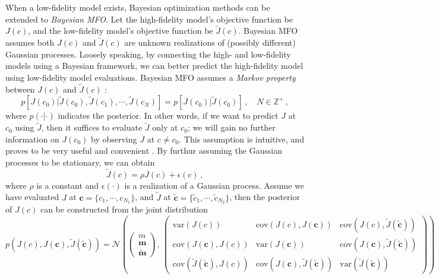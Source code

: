\documentclass[a4paper,onecolumn]{article}
\theoremstyle{remark}
\begin{document}
\noindent When a low-fidelity model exists, Bayesian optimization methods
can be extended to \emph{Bayesian MFO}.
Let the high-fidelity model's objective function
be $J(c)$, and the low-fidelity model's objective function be $\tilde{J}(c)$.
Bayesian MFO assumes both $J(c)$ and $\tilde{J}(c)$ are unknown realizations
of (possibly different) Gaussian processes.
Loosely speaking, by connecting the high- and low-fidelity models using 
a Bayesian framework, we can better predict the high-fidelity model using
low-fidelity model evaluations.
Bayesian MFO assumes a \emph{Markov property}
between $J(c)$ and $\tilde{J}(c)$ \cite{KennedyOhagan2}:
\begin{equation}
    p\left[ J(c_0)\Big| \tilde{J}(c_0), \tilde{J}(c_1),\cdots, \tilde{J}(c_N)\right]
    = p\left[ J(c_0)\Big| \tilde{J}(c_0)\right]
    \,,\quad
    N\in \mathbb{Z}^+\,,
    \label{ohagan_assumption}
\end{equation}
where $p(\cdot|\cdot)$ indicates the posterior. In other words,
if we want to predict $J$ at $c_0$ using $\tilde{J}$, then it suffices to 
evaluate $\tilde{J}$ only at $c_0$; we will gain no further information on $J(c_0)$ 
by observing $J$ at $c\neq c_0$. This assumption is intuitive, and proves to be
very useful and convenient \cite{KennedyOhagan1, KennedyOhagan2}. 
By furthur assuming the Gaussian processes to be stationary, we can obtain
\begin{equation}
    \tilde{J}(c) = \rho J(c) + \epsilon(c)\,,
\end{equation}
where $\rho$ is a constant and $\epsilon(\cdot)$ is a realization of a Gaussian 
process. Assume we have evaluated $J$ at $\mathbf{c}=\{c_1,\cdots, c_{N_1}\}$,
and $\tilde{J}$ at $\mathbf{\tilde{c}} = \{\tilde{c}_1,\cdots, \tilde{c}_{N_2}\}$,
then the posterior of $J(c)$ can be constructed from the joint distribution
\begin{equation}
    p\left(J(c), J(\mathbf{c}), \tilde{J}(\mathbf{\tilde{c}})\right) 
    = \mathcal{N}\left(
    \begin{pmatrix}
        m\\ \mathbf{m} \\ \mathbf{\tilde{m}}
    \end{pmatrix},\,
    \begin{pmatrix}
        \textrm{var}(J(c)) &
        \textrm{cov}(J(c), J(\mathbf{c}) ) &
        \textrm{cov}(J(c), \tilde{J}(\mathbf{\tilde{c}}))\\
        \textrm{cov}(J(\mathbf{c}), J(c) ) & 
        \textrm{var}(J(\mathbf{c})) & 
        \textrm{cov}(J(\mathbf{c}), \tilde{J}(\mathbf{\tilde{c}}))\\
        \textrm{cov}(\tilde{J}(\mathbf{\tilde{c}}), J(c)) & 
        \textrm{cov}( J(\mathbf{c}), \tilde{J}(\mathbf{\tilde{c}}) ) & 
        \textrm{var}(\tilde{J}(\mathbf{\tilde{c}}))
    \end{pmatrix}
    \right)\,
    \label{joint distribution}
\end{equation}
\end{document}
